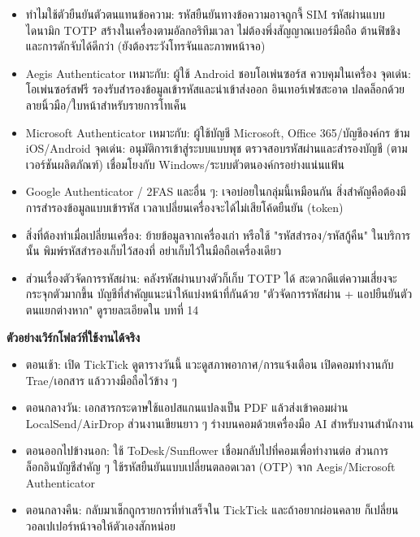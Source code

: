 
\begin{itemize}
  \item ทำไมใช้ตัวยืนยันตัวตนแทนข้อความ: รหัสยืนยันทางข้อความอาจถูกจี้ SIM รหัสผ่านแบบไดนามิก TOTP สร้างในเครื่องตามอัลกอริทึมเวลา ไม่ต้องพึ่งสัญญาณเบอร์มือถือ ต้านฟิชชิงและการดักจับได้ดีกว่า (ยังต้องระวังโทรจันและภาพหน้าจอ)
  \item Aegis Authenticator เหมาะกับ: ผู้ใช้ Android ชอบโอเพ่นซอร์ส ควบคุมในเครื่อง จุดเด่น: โอเพ่นซอร์สฟรี รองรับสำรองข้อมูลเข้ารหัสและนำเข้าส่งออก อินเทอร์เฟซสะอาด ปลดล็อกด้วยลายนิ้วมือ/ใบหน้าสำหรับรายการโทเค็น
  \item Microsoft Authenticator เหมาะกับ: ผู้ใช้บัญชี Microsoft, Office 365/บัญชีองค์กร ข้าม iOS/Android จุดเด่น: อนุมัติการเข้าสู่ระบบแบบพุช ตรวจสอบรหัสผ่านและสำรองบัญชี (ตามเวอร์ชันผลิตภัณฑ์) เชื่อมโยงกับ Windows/ระบบตัวตนองค์กรอย่างแน่นแฟ้น
  \item Google Authenticator / 2FAS และอื่น ๆ: เจอบ่อยในกลุ่มนี้เหมือนกัน สิ่งสำคัญคือต้องมีการสำรองข้อมูลแบบเข้ารหัส เวลาเปลี่ยนเครื่องจะได้ไม่เสียโค้ดยืนยัน (token)
  \item สิ่งที่ต้องทำเมื่อเปลี่ยนเครื่อง: ย้ายข้อมูลจากเครื่องเก่า หรือใช้ "รหัสสำรอง/รหัสกู้คืน" ในบริการนั้น พิมพ์รหัสสำรองเก็บไว้สองที่ อย่าเก็บไว้ในมือถือเครื่องเดียว
  \item ส่วนเรื่องตัวจัดการรหัสผ่าน: คลังรหัสผ่านบางตัวก็เก็บ TOTP ได้ สะดวกดีแต่ความเสี่ยงจะกระจุกตัวมากขึ้น บัญชีที่สำคัญแนะนำให้แบ่งหน้าที่กันด้วย "ตัวจัดการรหัสผ่าน + แอปยืนยันตัวตนแยกต่างหาก" ดูรายละเอียดใน บทที่ 14
\end{itemize}


\textbf{ตัวอย่างเวิร์กโฟลว์ที่ใช้งานได้จริง}\par

\begin{itemize}
  \item ตอนเช้า: เปิด TickTick ดูตารางวันนี้ แวะดูสภาพอากาศ/การแจ้งเตือน เปิดคอมทำงานกับ Trae/เอกสาร แล้ววางมือถือไว้ข้าง ๆ
  \item ตอนกลางวัน: เอกสารกระดาษใช้แอปสแกนแปลงเป็น PDF แล้วส่งเข้าคอมผ่าน LocalSend/AirDrop ส่วนงานเขียนยาว ๆ ร่างบนคอมด้วยเครื่องมือ AI สำหรับงานสำนักงาน
  \item ตอนออกไปข้างนอก: ใช้ ToDesk/Sunflower เชื่อมกลับไปที่คอมเพื่อทำงานต่อ ส่วนการล็อกอินบัญชีสำคัญ ๆ ใช้รหัสยืนยันแบบเปลี่ยนตลอดเวลา (OTP) จาก Aegis/Microsoft Authenticator
  \item ตอนกลางคืน: กลับมาเช็กถูกรายการที่ทำเสร็จใน TickTick และถ้าอยากผ่อนคลาย ก็เปลี่ยนวอลเปเปอร์หน้าจอให้ตัวเองสักหน่อย
\end{itemize}

